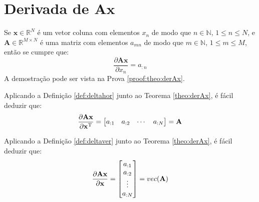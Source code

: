 \section{Derivada de $\mathbf{A}\mathbf{x}$}

\begin{theorem}\label{theo:derAx}
Se 
$\mathbf{x}\in \mathbb{R}^N$ é um vetor coluna com elementos $x_n$ de modo que
$n\in \mathbb{N}$, $1 \leq n \leq N$, e 
$\mathbf{A} \in \mathbb{R}^{M\times N}$ é uma matriz com elementos $a_{mn}$ de modo que
$m\in \mathbb{N}$, $1 \leq m \leq M$, então se cumpre que:
\begin{equation}
\frac{\partial \mathbf{A}\mathbf{x}}{\partial x_n}=a_{:n}
\end{equation}
A demostração pode ser vista na Prova \ref{proof:theo:derAx}.
\end{theorem}

\begin{corollaryT}\label{coro:derAx1}
Aplicando a Definição \ref{def:deltahor} junto ao Teorema \ref{theo:derAx}, é
fácil deduzir que:
\begin{equation}
\frac{\partial \mathbf{A}\mathbf{x}}{\partial \mathbf{x}^{\mathrm{T}}}=
\left[
\begin{matrix}
 a_{:1} &  a_{:2} &  \cdots &  a_{:N}
\end{matrix}
\right]=
\mathbf{A}
\end{equation}
\end{corollaryT}

\begin{corollaryT}\label{coro:derAx2}
Aplicando a Definição \ref{def:deltaver} junto ao Teorema \ref{theo:derAx}, é
fácil deduzir que:
\begin{equation}
\frac{\partial \mathbf{A}\mathbf{x}}{\partial \mathbf{x}}=
\left[
\begin{matrix}
 a_{:1} \\  a_{:2} \\  \vdots \\  a_{:N}
\end{matrix}
\right]=vec(\mathbf{A})
\end{equation}
\end{corollaryT}

